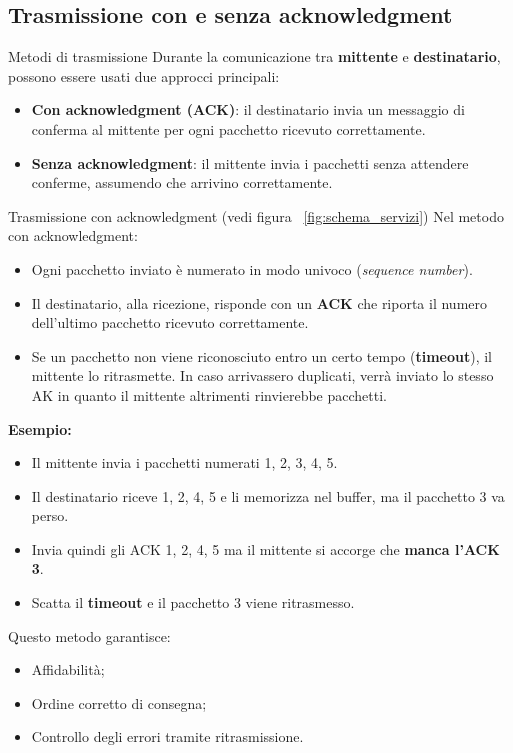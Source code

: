 \documentclass[a4paper,12pt]{report}
\begin{document}
\subsection{Trasmissione con e senza acknowledgment}

\begin{defbox}{Metodi di trasmissione}
Durante la comunicazione tra \textbf{mittente} e \textbf{destinatario}, possono essere usati due approcci principali:
\begin{itemize}
    \item \textbf{Con acknowledgment (ACK)}: il destinatario invia un messaggio di conferma al mittente per ogni pacchetto ricevuto correttamente.
    \item \textbf{Senza acknowledgment}: il mittente invia i pacchetti senza attendere conferme, assumendo che arrivino correttamente.
\end{itemize}
\end{defbox}

\begin{esempiobox}{Trasmissione con acknowledgment (vedi figura ~\ref{fig:schema_servizi})}
Nel metodo con acknowledgment:
\begin{itemize}
    \item Ogni pacchetto inviato è numerato in modo univoco (\textit{sequence number}).
    \item Il destinatario, alla ricezione, risponde con un \textbf{ACK} che riporta il numero dell’ultimo pacchetto ricevuto correttamente.
    \item Se un pacchetto non viene riconosciuto entro un certo tempo (\textbf{timeout}), il mittente lo ritrasmette. In caso arrivassero duplicati, verrà inviato lo stesso AK in quanto il mittente altrimenti rinvierebbe pacchetti.
\end{itemize}

\textbf{Esempio:}
\begin{itemize}
    \item Il mittente invia i pacchetti numerati 1, 2, 3, 4, 5.
    \item Il destinatario riceve 1, 2, 4, 5 e li memorizza nel buffer, ma il pacchetto 3 va perso.
    \item Invia quindi gli ACK 1, 2, 4, 5 ma il mittente si accorge che \textbf{manca l’ACK 3}.
    \item Scatta il \textbf{timeout} e il pacchetto 3 viene ritrasmesso.
\end{itemize}

Questo metodo garantisce:
\begin{itemize}
    \item Affidabilità;
    \item Ordine corretto di consegna;
    \item Controllo degli errori tramite ritrasmissione.
\end{itemize}
\end{esempiobox}
\end{document}
